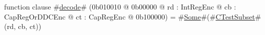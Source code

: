 function clause #\hyperref[sailMIPSzdecode]{decode}# (0b010010 @ 0b00000 @ rd : IntRegEnc @ cb : CapRegOrDDCEnc @ ct : CapRegEnc @ 0b100000) = #\hyperref[sailMIPSzSome]{Some}#(#\hyperref[sailMIPSzCTestSubset]{CTestSubset}#(rd, cb, ct))
